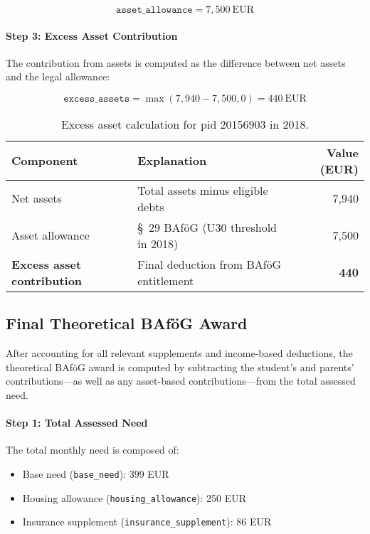 \[
\texttt{asset\_allowance} = 7{,}500~\text{EUR}
\]

\paragraph{Step 3: Excess Asset Contribution}

The contribution from assets is computed as the difference between net assets and the legal allowance:

\[
\texttt{excess\_assets} = \max(7{,}940 - 7{,}500, 0) = 440~\text{EUR}
\]

\begin{table}[H]
\footnotesize
\centering
\begin{tabularx}{\textwidth}{lXr}
\toprule
\textbf{Component} & \textbf{Explanation} & \textbf{Value (EUR)} \\
\midrule
Net assets & Total assets minus eligible debts & 7,940 \\
Asset allowance & §~29 BAföG (U30 threshold in 2018) & 7,500 \\
\midrule
\textbf{Excess asset contribution} & Final deduction from BAföG entitlement & \textbf{440} \\
\bottomrule
\end{tabularx}
\caption{Excess asset calculation for pid 20156903 in 2018.}
\label{table:bafoeg_excess_assets}
\end{table}


\subsection{Final Theoretical BAföG Award}

After accounting for all relevant supplements and income-based deductions, the theoretical BAföG award is computed by subtracting the student’s and parents’ contributions—as well as any asset-based contributions—from the total assessed need.

\paragraph{Step 1: Total Assessed Need}

The total monthly need is composed of:
\begin{itemize}
    \item Base need (\texttt{base\_need}): 399 EUR
    \item Housing allowance (\texttt{housing\_allowance}): 250 EUR
    \item Insurance supplement (\texttt{insurance\_supplement}): 86 EUR
\end{itemize}

